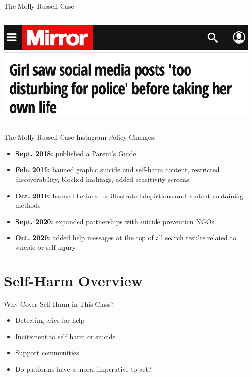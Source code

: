 \documentclass[nobackground,dvipsnames,table]{beamer}
\begin{document}
\begin{frame}{The Molly Russell Case}
\begin{columns}
            \includegraphics[width=\textwidth]{molly-russell-article-4}
    \end{columns}
\end{frame}

\begin{frame}{The Molly Russell Case}
    Instagram Policy Changes:\\
    \begin{itemize}
        \item \textbf{Sept. 2018:} published a Parent’s Guide
        \item \textbf{Feb. 2019:} banned graphic suicide and self-harm content, restricted discoverability, blocked hashtags, added sensitivity screens
        \item \textbf{Oct. 2019:} banned fictional or illustrated depictions and content containing methods
        \item \textbf{Sept. 2020:} expanded partnerships with suicide prevention NGOs
        \item \textbf{Oct. 2020:} added help messages at the top of all search results related to suicide or self-injury
    \end{itemize}
\end{frame}


\section{Self-Harm Overview}%

\begin{frame}{Why Cover Self-Harm in This Class?}
    \large
    \begin{itemize}
        \item Detecting cries for help
        \item Incitement to self harm or suicide
        \item Support communities
        \item Do platforms have a moral imperative to act?
    \end{itemize}
\end{frame}
\end{document}
